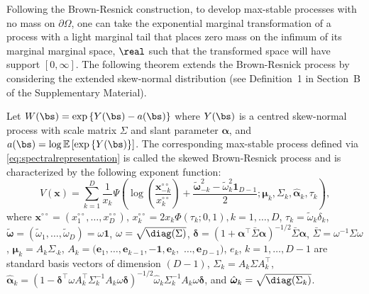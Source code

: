 \documentclass[12pt]{article}
\begin{document}
Following the Brown-Resnick construction, to develop max-stable processes with no mass on $\partial\Omega$, one can take the exponential marginal transformation of a process with a light marginal tail that places zero mass on the infimum of its marginal marginal space, $\real$ such that the transformed space will have support $[0, \infty]$. The following theorem extends the Brown-Resnick process by considering the extended skew-normal distribution (see Definition~1 in Section~B of the Supplementary Material).

\begin{theorem}
\label{thm:skewBR}
Let $W(\bs) = \exp \left\{ Y(\bs) - a(\bs)\right\}$ where $Y(\bs)$ is a centred skew-normal process with scale matrix $\Sigma$ and slant parameter $\bm \alpha$, and $a(\bs) = \log \mathbb{E} \left[ \exp\left\{ Y(\bs) \right\}\right]$.
The corresponding max-stable process defined via \eqref{eq:spectralrepresentation} is called the skewed Brown-Resnick process and is characterized by the following exponent function:
%
\begin{equation}
\label{eq:V_skBR}
V(\bm x) =\sum_{k=1}^D \frac{1}{x_k} 
\Psi \left(\log \left( \frac{\bm x^{\circ\circ}_{-k}}{x^{\circ\circ}_k} \right) + \frac{\tilde{\bm \omega}_{-k}^2 - \tilde{\omega}_k^2 \bm 1_{D-1}}{2} ; \bm \mu_k, \Sigma_k, \hat{\bm \alpha}_k, \tau_k \right),
\end{equation}
%
where 
$\bm x^{\circ\circ} = \left( x^{\circ\circ}_1, \ldots, x^{\circ\circ}_D\right)$, 
$x^{\circ\circ}_k = 2x_k \Phi\left( \tau_k; 0, 1 \right), k=1, \ldots, D$, 
$\tau_k = \tilde{\omega}_k \delta_k$, $\tilde{\bm \omega} = \left( \tilde{\omega}_1, \ldots, \tilde{ \omega}_D\right) = \omega \bm 1$, $\omega = \sqrt{\diag(\Sigma)}$, 
$\bm \delta = \left( 1 + \bm \alpha^\top \bar{\Sigma} \bm \alpha\right)^{-1/2}\bar{\Sigma} \bm \alpha$, 
$\bar{\Sigma} = \omega^{-1} \Sigma \omega$,
$\bm\mu_k = A_k \Sigma_{\cdot k}$, 
$A_k = (\bm e_1, \ldots,\bm e_{k-1}, -\bm 1,\bm e_{k},$ $\ldots,\bm e_{D-1})$, 
$e_k$, $k=1, \ldots, D-1$ are standard basis vectors of dimension $(D-1)$, 
$\Sigma_k = A_k \Sigma A_k^\top$, 
$\hat{\bm\alpha}_k = \left(1-\bm\delta^\top \omega A_k^\top\Sigma_k^{-1} A_k \omega\bm\delta \right)^{-1/2} \hat{ \omega}_k\Sigma_k^{-1}A_k \omega\bm\delta$, 
and $\hat{\bm \omega}_k = \sqrt{\diag(\Sigma_k)}$.
\end{theorem}
\end{document}
